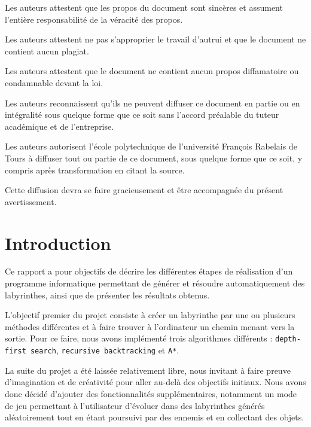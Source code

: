 \documentclass[12pt]{scrreprt} %
\begin{document}
Les auteurs attestent que les propos du document sont sincères et assument l’entière responsabilité de la véracité des propos.

Les auteurs attestent ne pas s’approprier le travail d’autrui et que le document ne contient aucun plagiat.

Les auteurs attestent que le document ne contient aucun propos diffamatoire ou condamnable devant la loi.

Les auteurs reconnaissent qu’ils ne peuvent diffuser ce document en partie ou en intégralité sous quelque forme que ce soit sans l’accord préalable du tuteur académique et de l’entreprise.

Les auteurs autorisent l’école polytechnique de l’université François Rabelais de Tours à diffuser tout ou partie de ce document, sous quelque forme que ce soit, y compris après transformation en citant la source.

Cette diffusion devra se faire gracieusement et être accompagnée du présent avertissement.

\newpage
\renewcommand{\contentsname}{Table des matières} %
\tableofcontents


\newpage
\chapter*{Introduction}


Ce rapport a pour objectifs de décrire les différentes étapes de réalisation d'un programme informatique permettant de générer et résoudre automatiquement des labyrinthes, ainsi que de présenter les résultats obtenus.

L'objectif premier du projet consiste à créer un labyrinthe par une ou plusieurs méthodes différentes et à faire trouver à l'ordinateur un chemin menant vers la sortie. Pour ce faire, nous avons implémenté trois algorithmes différents :
\texttt{depth-first search}, \texttt{recursive backtracking} et \texttt{A*}.

La suite du projet a été laissée relativement libre, nous invitant à faire preuve d'imagination et de créativité pour aller au-delà des objectifs initiaux. Nous avons donc décidé d'ajouter des fonctionnalités supplémentaires, notamment un mode de jeu permettant à l'utilisateur d'évoluer dans des labyrinthes générés aléatoirement tout en étant poursuivi par des ennemis et en collectant des objets.
\end{document}
